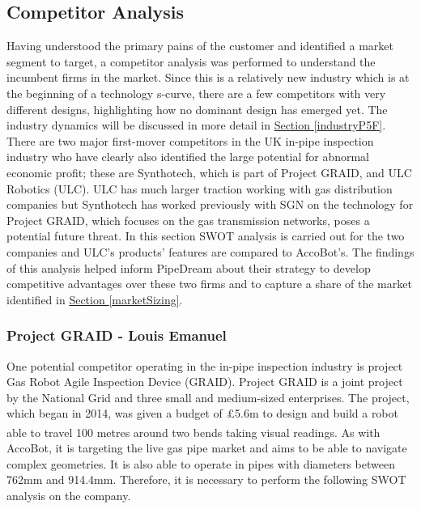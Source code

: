 \documentclass[11pt]{article}		%
\newcommand{\supercite}[1]{\textsuperscript{\cite{#1}}}		%
\newcommand{\sectref}[1]{\hyperref[#1]{Section \ref*{#1}}}     %
\begin{document}
    \subsection{Competitor Analysis} \label{competitorAnalysis}
        Having understood the primary pains of the customer and identified a market segment to target, a competitor analysis was performed to understand the incumbent firms in the market.
        Since this is a relatively new industry which is at the beginning of a technology s-curve, there are a few competitors with very different designs, highlighting how no dominant design has emerged yet. The industry dynamics will be discussed in more detail in \sectref{industryP5F}. There are two major first-mover competitors in the UK in-pipe inspection industry who have clearly also identified the large potential for abnormal economic profit; these are Synthotech, which is part of Project GRAID, and ULC Robotics (ULC). ULC has much larger traction working with gas distribution companies but Synthotech has worked previously with SGN on the technology for Project GRAID, which focuses on the gas transmission networks, poses a potential future threat. In this section SWOT analysis is carried out for the two companies and ULC's products' features are compared to AccoBot's. The findings of this analysis helped inform PipeDream about their strategy to develop competitive advantages over these two firms and to capture a share of the market identified in \sectref{marketSizing}.

		\subsubsection[Project GRAID]{Project GRAID - Louis Emanuel}
		
			One potential competitor operating in the in-pipe inspection industry is project Gas Robot Agile Inspection Device (GRAID). Project GRAID is a joint project by the National Grid and three small and medium-sized enterprises. The project, which began in 2014, was given a budget of £5.6m to design and build a robot able to travel 100 metres around two bends taking visual readings\supercite{graidy}. As with AccoBot, it is targeting the live gas pipe market and aims to be able to navigate complex geometries. It is also able to operate in pipes with diameters between 762mm and 914.4mm. Therefore, it is necessary to perform the following SWOT analysis on the company.
			
\end{document}
